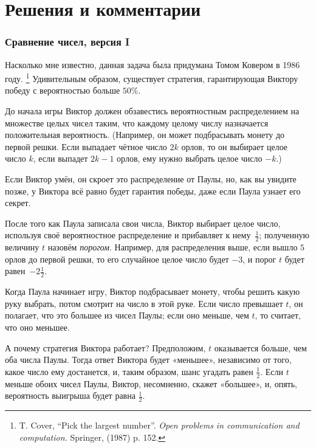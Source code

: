 \section*{Решения и комментарии}

\subsubsection*{Сравнение чисел, версия I}%

Насколько мне известно, данная задача была придумана Томом Ковером %
в 1986 году.%
\footnote{T. Cover, ``Pick the largest number''. \emph{Open problems in communication and computation.} Springer, (1987) p. 152.}
Удивительным образом, существует стратегия, гарантирующая Виктору победу с вероятностью больше $50\%$.

\medskip

До начала игры Виктор должен обзавестись вероятностным распределением на множестве целых чисел таким, что каждому целому числу назначается положительная вероятность.
(Например, он может подбрасывать монету до первой решки.
Если выпадает чётное число $2k$ орлов, то он выбирает целое число $k$, если выпадет $2k-1$ орлов, ему нужно выбрать целое число $-k$.)

Если Виктор умён, он скроет это распределение от Паулы, но, как вы увидите позже, у Виктора всё равно будет гарантия победы, даже если Паула узнает его секрет.

После того как Паула записала свои числа, Виктор выбирает целое число, используя своё вероятностное распределение и прибавляет к нему~$\tfrac12$;
полученную величину $t$ назовём \emph{порогом}.
Например, для распределения выше, если вышло $5$ орлов до первой решки, то его случайное целое число будет $-3$, и порог $t$ будет равен~$-2 \tfrac12$.

Когда Паула начинает игру, Виктор подбрасывает монету, чтобы решить какую руку выбрать, потом смотрит на число в этой руке.
Если число превышает $t$, он полагает, что это большее из чисел Паулы; если оно меньше, чем $t$, то считает, что оно меньшее.

А почему стратегия Виктора работает? 
Предположим, $t$ оказывается больше, чем оба числа Паулы.
Тогда ответ Виктора будет «меньшее», независимо от того, какое число ему достанется, и, таким образом, шанс угадать равен $\tfrac12$.
Если $t$ меньше обоих чисел Паулы, Виктор, несомненно, скажет «большее», и, опять, вероятность выигрыша будет равна $\tfrac12$.

